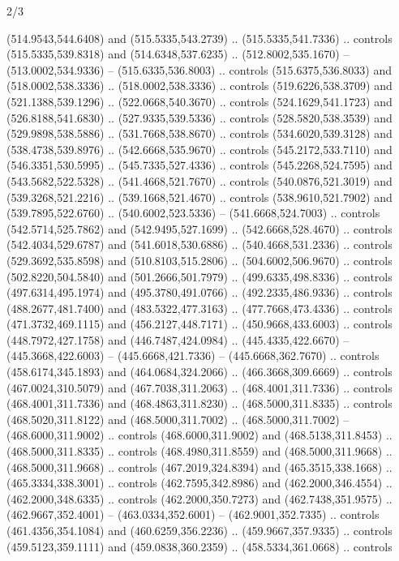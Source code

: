 \begin{flagdescription}{2/3}
\begin{scope}[xshift=0.5\flaglength,yshift=0.5\flagwidth,scale=\flagwidth/525.28]
\begin{scope}[y=0.1mm, x=0.1mm, yscale=-1,shift={(-381.5,-404)}]
\begin{scope}[shift={(5.25001,4.53053)},miter limit=4.00,line width=0.800\lw]
  (514.9543,544.6408) and (515.5335,543.2739) .. (515.5335,541.7336) .. controls
  (515.5335,539.8318) and (514.6348,537.6235) .. (512.8002,535.1670) --
  (513.0002,534.9336) -- (515.6335,536.8003) .. controls (515.6375,536.8033) and
  (518.0002,538.3336) .. (518.0002,538.3336) .. controls (519.6226,538.3709) and
  (521.1388,539.1296) .. (522.0668,540.3670) .. controls (524.1629,541.1723) and
  (526.8188,541.6830) .. (527.9335,539.5336) .. controls (528.5820,538.3539) and
  (529.9898,538.5886) .. (531.7668,538.8670) .. controls (534.6020,539.3128) and
  (538.4738,539.8976) .. (542.6668,535.9670) .. controls (545.2172,533.7110) and
  (546.3351,530.5995) .. (545.7335,527.4336) .. controls (545.2268,524.7595) and
  (543.5682,522.5328) .. (541.4668,521.7670) .. controls (540.0876,521.3019) and
  (539.3268,521.2216) .. (539.1668,521.4670) .. controls (538.9610,521.7902) and
  (539.7895,522.6760) .. (540.6002,523.5336) -- (541.6668,524.7003) .. controls
  (542.5714,525.7862) and (542.9495,527.1699) .. (542.6668,528.4670) .. controls
  (542.4034,529.6787) and (541.6018,530.6886) .. (540.4668,531.2336) .. controls
  (529.3692,535.8598) and (510.8103,515.2806) .. (504.6002,506.9670) .. controls
  (502.8220,504.5840) and (501.2666,501.7979) .. (499.6335,498.8336) .. controls
  (497.6314,495.1974) and (495.3780,491.0766) .. (492.2335,486.9336) .. controls
  (488.2677,481.7400) and (483.5322,477.3163) .. (477.7668,473.4336) .. controls
  (471.3732,469.1115) and (456.2127,448.7171) .. (450.9668,433.6003) .. controls
  (448.7972,427.1758) and (446.7487,424.0984) .. (445.4335,422.6670) --
  (445.3668,422.6003) -- (445.6668,421.7336) -- (445.6668,362.7670) .. controls
  (458.6174,345.1893) and (464.0684,324.2066) .. (466.3668,309.6669) .. controls
  (467.0024,310.5079) and (467.7038,311.2063) .. (468.4001,311.7336) .. controls
  (468.4001,311.7336) and (468.4863,311.8230) .. (468.5000,311.8335) .. controls
  (468.5020,311.8122) and (468.5000,311.7002) .. (468.5000,311.7002) --
  (468.6000,311.9002) .. controls (468.6000,311.9002) and (468.5138,311.8453) ..
  (468.5000,311.8335) .. controls (468.4980,311.8559) and (468.5000,311.9668) ..
  (468.5000,311.9668) .. controls (467.2019,324.8394) and (465.3515,338.1668) ..
  (465.3334,338.3001) .. controls (462.7595,342.8986) and (462.2000,346.4554) ..
  (462.2000,348.6335) .. controls (462.2000,350.7273) and (462.7438,351.9575) ..
  (462.9667,352.4001) -- (463.0334,352.6001) -- (462.9001,352.7335) .. controls
  (461.4356,354.1084) and (460.6259,356.2236) .. (459.9667,357.9335) .. controls
  (459.5123,359.1111) and (459.0838,360.2359) .. (458.5334,361.0668) .. controls

\end{scope}
\end{scope}
\end{scope}
\end{flagdescription}
